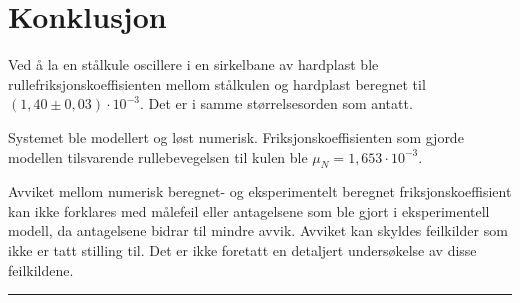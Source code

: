 \section{Konklusjon}
Ved å la en stålkule oscillere i en sirkelbane av hardplast ble rullefriksjonskoeffisienten mellom stålkulen og hardplast beregnet til $(1,40 \pm 0,03) \cdot 10^{-3}$. Det er i samme størrelsesorden som antatt.

Systemet ble modellert og løst numerisk. Friksjonskoeffisienten som gjorde modellen tilsvarende rullebevegelsen til kulen ble $\mu_N = 1,653 \cdot 10^{-3}$.

Avviket mellom numerisk beregnet- og eksperimentelt beregnet friksjonskoeffisient kan ikke forklares med målefeil eller antagelsene som ble gjort i eksperimentell modell, da antagelsene bidrar til mindre avvik. Avviket kan skyldes feilkilder som ikke er tatt stilling til. Det er ikke foretatt en detaljert undersøkelse av disse feilkildene.


\begingroup
\begin{center}
\rule{2cm}{.4pt} %
\end{center}
\makeatletter
{} %
\makeatother


\endgroup

